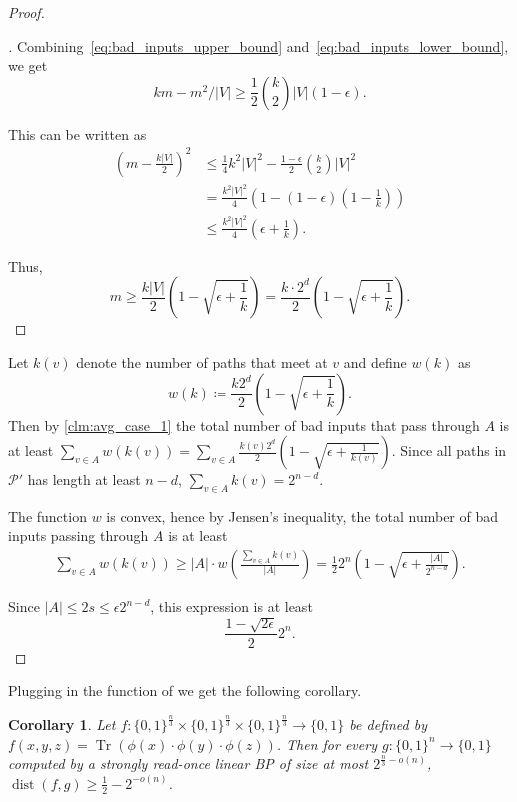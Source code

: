 \documentclass[a4paper,11pt,draft]{article}
\newtheorem{corollary}[theorem]{Corollary}
\theoremstyle{definition}
\theoremstyle{remark}
\newenvironment{claimproof}[1][\proofname]{\begin{proof}[#1]\renewcommand*{\qedsymbol}{$\blacksquare$}}{\end{proof}}
\DeclareMathOperator{\dist}{dist}
\DeclareMathOperator{\Tr}{Tr}
\newcommand{\card}[1]{{\left|#1\right|}}
\newcommand{\Q}{{\{0,1\}}}
\newcommand{\calP}{\mathcal{P}}
\newcommand{\sreadonce}{strongly read-once}
\begin{document}
\begin{proof}
\begin{claimproof}
    Combining~\eqref{eq:bad_inputs_upper_bound} and~\eqref{eq:bad_inputs_lower_bound}, we get
    \[
      km-m^2/\card{V} \ge \frac{1}{2} \binom{k}{2} \card{V} (1-\epsilon).
    \]
  
    This can be written as
    \begin{align*}
      {\left(m-\frac{k\card{V}}{2}\right)}^2 &\le
      \frac{1}{4} k^2 \card{V}^2 - \frac{1-\epsilon}{2}\binom{k}{2}\card{V}^2 \\ &=
      \frac{k^2 \card{V}^2}{4} \left(1 - (1-\epsilon)\left(1-\frac{1}{k}\right)\right) \\ &\le
      \frac{k^2 \card{V}^2}{4} \left(\epsilon + \frac{1}{k}\right).
    \end{align*}
  
    Thus,
    \[
      m \ge \frac{k\card{V}}{2}\left(1 - \sqrt{\epsilon + \frac{1}{k}}\right) = \frac{k\cdot 2^d}{2}\left(1 - \sqrt{\epsilon + \frac{1}{k}}\right).
    \]
  \end{claimproof}

  Let $k(v)$ denote the number of paths that meet at $v$ and define $w(k)$ as
  \[
    w(k) \coloneqq \frac{k 2^d}{2}\left(1-\sqrt{\epsilon+\frac{1}{k}}\right).
  \]
  Then by \cref{clm:avg_case_1} the total number of bad inputs that pass through $A$ is at least $\sum_{v\in A} w(k(v)) = \sum_{v\in A} \frac{k(v) 2^d}{2}\left(1-\sqrt{\epsilon+\frac{1}{k(v)}}\right)$.
  Since all paths in $\calP'$ has length at least $n-d$, $\sum_{v \in A} k(v) = 2^{n-d}$.

  The function $w$ is convex, hence by Jensen's inequality, the total number of bad inputs passing through $A$ is at least
  \begin{align*}
    \sum_{v \in A} w(k(v)) \ge
    \card{A} \cdot w\left(\frac{\sum_{v \in A} k(v)}{\card{A}}\right) = \frac{1}{2} 2^n \left(1-\sqrt{\epsilon + \frac{\card{A}}{2^{n-d}}}\right).
  \end{align*}
  
  Since $\card{A} \le 2s \le \epsilon 2^{n-d}$, this expression is at least
  \[
    \frac{1-\sqrt{2\epsilon}}{2} 2^n.
  \]
\end{proof}

%

%
%
%
%
%

Plugging in the function of  we get the following corollary.

\begin{corollary}
Let $f:\Q^{\frac{n}{3}}\times \Q^{\frac{n}{3}} \times \Q^{\frac{n}{3}} \rightarrow \Q$ be defined by $f(x,y,z) = \Tr(\phi(x) \cdot \phi(y) \cdot \phi(z))$. Then for every $g:\Q^n \rightarrow \Q$ computed by a \sreadonce{} linear BP of size at most $2^{\frac{n}{3} - o(n)}$, $\dist(f, g) \ge \frac{1}{2} - 2^{-o(n)}$.
\end{corollary}
\end{document}

